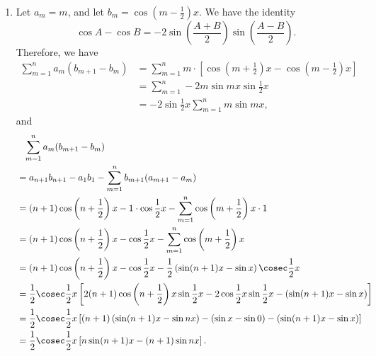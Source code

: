 \begin{enumerate}
    \item Let \(a_m = m\), and let \(b_m = \cos \left(m - \frac{1}{2}\right)x\). We have the identity
          \[
              \cos A - \cos B = - 2 \sin\left(\frac{A + B}{2}\right) \sin \left(\frac{A - B}{2}\right).
          \]
          Therefore, we have
          \begin{align*}
              \sum_{m = 1}^{n} a_m (b_{m + 1} - b_m) & = \sum_{m = 1}^{n} m \cdot \left[\cos \left(m + \frac{1}{2}\right)x - \cos \left(m - \frac{1}{2}\right)x\right] \\
                                                     & = \sum_{m = 1}^{n} -2m \sin mx \sin \frac{1}{2}x                                                                \\
                                                     & = -2 \sin \frac{1}{2} x \sum_{m = 1}^{n} m \sin mx,
          \end{align*}
          and
          \begin{align*}
               & \phantom{=} \sum_{m = 1}^{n} a_m (b_{m + 1} - b_m)                                                                                                                                         \\
               & = a_{n + 1} b_{n + 1} - a_1 b_1 - \sum_{m = 1}^{n} b_{m + 1} (a_{m + 1} - a_m)                                                                                                             \\
               & = (n + 1) \cos \left(n + \frac{1}{2}\right)x - 1 \cdot \cos \frac{1}{2} x - \sum_{m = 1}^{n} \cos\left(m + \frac{1}{2}\right)x \cdot 1                                                     \\
               & = (n + 1) \cos \left(n + \frac{1}{2}\right)x - \cos \frac{1}{2} x - \sum_{m = 1}^{n} \cos\left(m + \frac{1}{2}\right)x                                                                     \\
               & = (n + 1) \cos \left(n + \frac{1}{2}\right)x - \cos \frac{1}{2} x - \frac{1}{2}\left(\sin (n + 1)x - \sin x\right)\cosec \frac{1}{2}x                                                      \\
               & = \frac{1}{2} \cosec \frac{1}{2}x \left[2(n + 1) \cos \left(n + \frac{1}{2}\right)x \sin \frac{1}{2}x - 2 \cos \frac{1}{2}x \sin \frac{1}{2}x - \left(\sin (n + 1)x - \sin x\right)\right] \\
               & = \frac{1}{2} \cosec \frac{1}{2}x \left[(n + 1) \left(\sin(n + 1)x - \sin nx\right) - (\sin x - \sin 0) - \left(\sin (n + 1)x - \sin x\right)\right]                                       \\
               & = \frac{1}{2} \cosec \frac{1}{2}x \left[n \sin(n + 1)x - (n + 1) \sin nx\right].
          \end{align*}


\end{enumerate}
